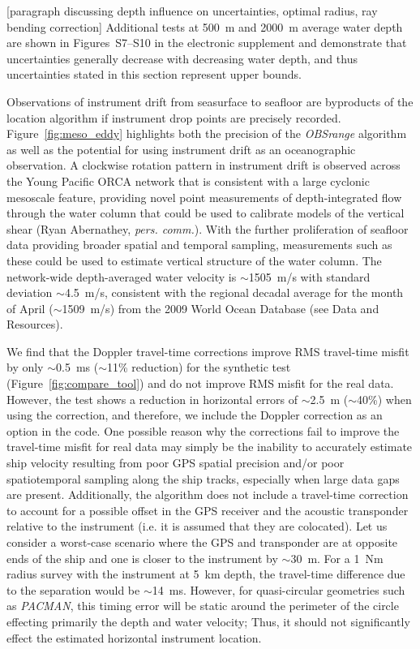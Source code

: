 [paragraph discussing depth influence on uncertainties, optimal radius, ray bending correction]
Additional tests at 500~m and 2000~m average water depth are shown in Figures~S7--S10 in the electronic supplement and demonstrate that uncertainties generally decrease with decreasing water depth, and thus uncertainties stated in this section represent upper bounds.

Observations of instrument drift from seasurface to seafloor are byproducts of the location algorithm if instrument drop points are precisely recorded. Figure~\ref{fig:meso_eddy} highlights both the precision of the \textit{OBSrange} algorithm as well as the potential for using instrument drift as an oceanographic observation. A clockwise rotation pattern in instrument drift is observed across the Young Pacific ORCA network that is consistent with a large cyclonic mesoscale feature, providing novel point measurements of depth-integrated flow through the water column that could be used to calibrate models of the vertical shear (Ryan Abernathey, \textit{pers. comm.}). With the further proliferation of seafloor data providing broader spatial and temporal sampling, measurements such as these could be used to estimate vertical structure of the water column. The network-wide depth-averaged water velocity is $\sim$1505~m/s with standard deviation $\sim$4.5~m/s, consistent with the regional decadal average for the month of April ($\sim$1509~m/s) from the 2009 World Ocean Database (see Data and Resources).

We find that the Doppler travel-time corrections improve RMS travel-time misfit by only $\sim$0.5~ms ($\sim$11\% reduction) for the synthetic test (Figure~\ref{fig:compare_tool}) and do not improve RMS misfit for the real data. However, the test shows a reduction in horizontal errors of $\sim$2.5~m ($\sim$40\%) when using the correction, and therefore, we include the Doppler correction as an option in the code. One possible reason why the corrections fail to improve the travel-time misfit for real data may simply be the inability to accurately estimate ship velocity resulting from poor GPS spatial precision and/or poor spatiotemporal sampling along the ship tracks, especially when large data gaps are present. Additionally, the algorithm does not include a travel-time correction to account for a possible offset in the GPS receiver and the acoustic transponder relative to the instrument (i.e. it is assumed that they are colocated). Let us consider a worst-case scenario where the GPS and transponder are at opposite ends of the ship and one is closer to the instrument by $\sim$30~m. For a 1~Nm radius survey with the instrument at 5~km depth, the travel-time difference due to the separation would be $\sim$14~ms. However, for quasi-circular geometries such as \textit{PACMAN}, this timing error will be static around the perimeter of the circle effecting primarily the depth and water velocity; Thus, it should not significantly effect the estimated horizontal instrument location.